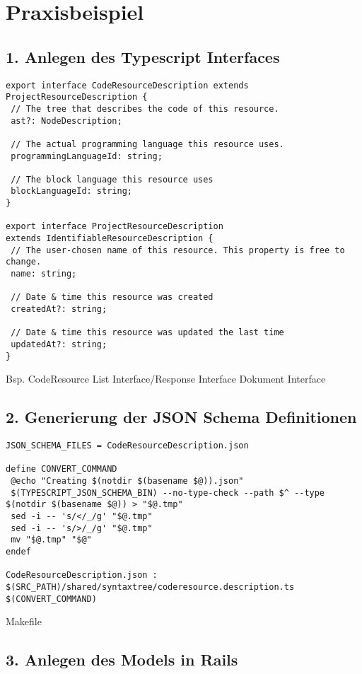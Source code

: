 \section{Praxisbeispiel}

\subsection{1. Anlegen des Typescript Interfaces}

\begin{lstlisting}
export interface CodeResourceDescription extends ProjectResourceDescription {
 // The tree that describes the code of this resource.
 ast?: NodeDescription;

 // The actual programming language this resource uses.
 programmingLanguageId: string;

 // The block language this resource uses
 blockLanguageId: string;
}

export interface ProjectResourceDescription
extends IdentifiableResourceDescription {
 // The user-chosen name of this resource. This property is free to change.
 name: string;

 // Date & time this resource was created
 createdAt?: string;

 // Date & time this resource was updated the last time
 updatedAt?: string;
}
\end{lstlisting}
Bsp. CodeResource
List Interface/Response Interface
Dokument Interface
\subsection{2. Generierung der JSON Schema Definitionen}
\begin{lstlisting}
JSON_SCHEMA_FILES = CodeResourceDescription.json

define CONVERT_COMMAND
 @echo "Creating $(notdir $(basename $@)).json"
 $(TYPESCRIPT_JSON_SCHEMA_BIN) --no-type-check --path $^ --type $(notdir $(basename $@)) > "$@.tmp"
 sed -i -- 's/</_/g' "$@.tmp"
 sed -i -- 's/>/_/g' "$@.tmp"
 mv "$@.tmp" "$@"
endef

CodeResourceDescription.json : $(SRC_PATH)/shared/syntaxtree/coderesource.description.ts
$(CONVERT_COMMAND)
\end{lstlisting}

Makefile
\subsection{3. Anlegen des Models in Rails}

